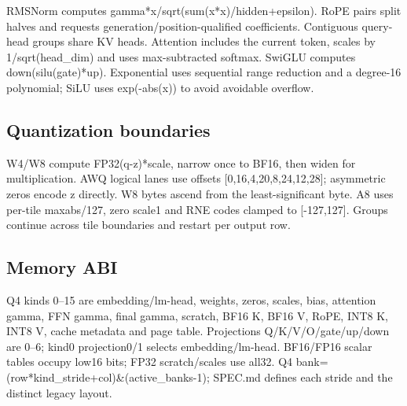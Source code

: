 \documentclass[11pt,a4paper]{article}
\begin{document}
RMSNorm computes gamma*\allowbreak{}x/\allowbreak{}sqrt(\allowbreak{}sum(\allowbreak{}x*\allowbreak{}x)\allowbreak{}/\allowbreak{}hidden+\allowbreak{}epsilon)\allowbreak{}. RoPE pairs split halves and requests generation/\allowbreak{}position-qualified coefficients. Contiguous query-head groups share KV heads. Attention includes the current token,\allowbreak{} scales by 1/\allowbreak{}sqrt(\allowbreak{}head\_\allowbreak{}dim)\allowbreak{} and uses max-subtracted softmax. SwiGLU computes down(\allowbreak{}silu(\allowbreak{}gate)\allowbreak{}*\allowbreak{}up)\allowbreak{}. Exponential uses sequential range reduction and a degree-16 polynomial; SiLU uses exp(\allowbreak{}-abs(\allowbreak{}x)\allowbreak{})\allowbreak{} to avoid avoidable overflow.

\subsection{Quantization boundaries}

W4/\allowbreak{}W8 compute FP32(\allowbreak{}q-z)\allowbreak{}*\allowbreak{}scale,\allowbreak{} narrow once to BF16,\allowbreak{} then widen for multiplication. AWQ logical lanes use offsets [\allowbreak{}0,\allowbreak{}16,\allowbreak{}4,\allowbreak{}20,\allowbreak{}8,\allowbreak{}24,\allowbreak{}12,\allowbreak{}28]\allowbreak{}; asymmetric zeros encode z directly. W8 bytes ascend from the least-significant byte. A8 uses per-tile maxabs/\allowbreak{}127,\allowbreak{} zero scale1 and RNE codes clamped to [\allowbreak{}-127,\allowbreak{}127]\allowbreak{}. Groups continue across tile boundaries and restart per output row.

\subsection{Memory ABI}

Q4 kinds 0–15 are embedding/\allowbreak{}lm-head,\allowbreak{} weights,\allowbreak{} zeros,\allowbreak{} scales,\allowbreak{} bias,\allowbreak{} attention gamma,\allowbreak{} FFN gamma,\allowbreak{} final gamma,\allowbreak{} scratch,\allowbreak{} BF16 K,\allowbreak{} BF16 V,\allowbreak{} RoPE,\allowbreak{} INT8 K,\allowbreak{} INT8 V,\allowbreak{} cache metadata and page table. Projections Q/\allowbreak{}K/\allowbreak{}V/\allowbreak{}O/\allowbreak{}gate/\allowbreak{}up/\allowbreak{}down are 0–6; kind0 projection0/\allowbreak{}1 selects embedding/\allowbreak{}lm-head. BF16/\allowbreak{}FP16 scalar tables occupy low16 bits; FP32 scratch/\allowbreak{}scales use all32. Q4 bank=\allowbreak{}(\allowbreak{}row*\allowbreak{}kind\_\allowbreak{}stride+\allowbreak{}col)\allowbreak{}\&(\allowbreak{}active\_\allowbreak{}banks-1)\allowbreak{}; SPEC.md defines each stride and the distinct legacy layout.
\end{document}
